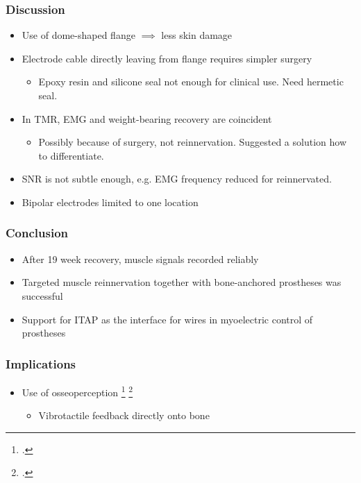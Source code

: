 \begin{frame}
    \frametitle{Discussion}

    \begin{itemize}
        \item Use of dome-shaped flange $\implies$ less skin damage
        \item Electrode cable directly leaving from flange requires simpler surgery \begin{itemize}
            \item Epoxy resin and silicone seal not enough for clinical use. Need hermetic seal.
        \end{itemize}
        \item In TMR, EMG and weight-bearing recovery are coincident \begin{itemize}
            \item Possibly because of surgery, not reinnervation. Suggested a solution how to differentiate.
        \end{itemize}
        \item SNR is not subtle enough, e.g. EMG frequency reduced for reinnervated.
        \item Bipolar electrodes limited to one location
    \end{itemize}

\end{frame}

\begin{frame}
    \frametitle{Conclusion}

    \begin{itemize}
        \item After 19 week recovery, muscle signals recorded reliably
        \item Targeted muscle reinnervation together with bone-anchored prostheses was successful
        \item Support for ITAP as the interface for wires in myoelectric control of prostheses
    \end{itemize}

\end{frame}

\begin{frame}
    \frametitle{Implications}

    \begin{figure}[h]\centering
    \end{figure}
    \begin{itemize}
        \item Use of osseoperception \footcite{ClementeFrancesco2017TaHM} \footcite{ÖrgelMarcus2021Oito} \begin{itemize}
            \item Vibrotactile feedback directly onto bone
        \end{itemize}
    \end{itemize}
\end{frame}